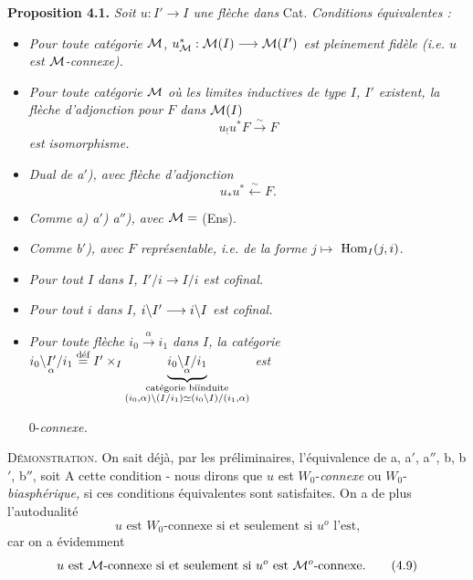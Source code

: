 \noindent\textbf{Proposition 4.1.} \textit{Soit $u : I' \longrightarrow I$ une flèche dans} Cat. \textit{Conditions équivalentes :}
\begin{itemize}[label={}]
\item[\textit{a)}] \textit{Pour toute catégorie $\mathcal{M}$, $u^*_{\mathcal{M}} : \mathcal{M}(I) \longrightarrow \mathcal{M}(I')$ est pleinement fidèle (i.e. $u$ est $\mathcal{M}$-connexe).}
\item[\textit{a$'$)}] \textit{Pour toute catégorie $\mathcal{M}$ où les limites inductives de type $I$, $I'$ existent, la flèche d'adjonction pour $F$ dans $\mathcal{M}(I)$} %
\[
u_!u^*F \xrightarrow{\sim} F
\]
\textit{est} \textit{isomorphisme.}
\item[\textit{a$''$)}] \textit{Dual de a$'$), avec} \textit{flèche d'adjonction}
\[
u_*u^* \xleftarrow{\sim} F. %
\]
\item[\textit{b) b$'$) b$''$)}] \textit{Comme a) a$'$) a$''$), avec $\mathcal{M} =$} (Ens).
\item[\textit{c)}] \textit{Comme b$'$), avec $F$ représentable, i.e. de la forme $j \longmapsto$} $\operatorname{Hom}_I(j, i)$.
\item[\textit{d)}] \textit{Pour tout $I$ dans $I$, $I'/i \longrightarrow I/i$ est cofinal.} %
\item[\textit{d$'$)}] \textit{Pour tout $i$ dans $I$, $i\backslash I' \longrightarrow i\backslash I$ est cofinal.}
\item[\textit{d$''$)}] \textit{Pour toute flèche $i_0 \xrightarrow{\alpha} i_1$ dans $I$, la catégorie} $i_0\backslash \underset{\alpha}{I'}/i_1 \overset{\text{déf}}{=} I' \times_I \underbrace{i_0\backslash \underset{\alpha}{I}/i_1}_{\substack{\text{catégorie biïnduite}\\ (i_0, \alpha)\backslash(I/i_1) \simeq (i_0\backslash I)/(i_1, \alpha)}}$ \qquad \textit{est}

0-\textit{connexe.}
\end{itemize}

\textsc{Démonstration.} On sait déjà, par les préliminaires, l'équivalence de a, a$'$, a$''$, b, b$'$, b$''$, soit A cette condition - nous dirons que $u$ est $W_0$-\textit{connexe} ou $W_0$-\textit{biasphérique,} si ces conditions équivalentes sont satisfaites. On a de plus l'autodualité
\[
\text{$u$ est $W_0$-connexe si et seulement si $u^o$ l'est,}
\tag*{(4.8)} %
\]
car on a évidemment
\[
\text{$u$ est $\mathcal{M}$-connexe si et seulement si $u^o$ est $\mathcal{M}^o$-connexe.}
\tag*{(4.9)}
\]



